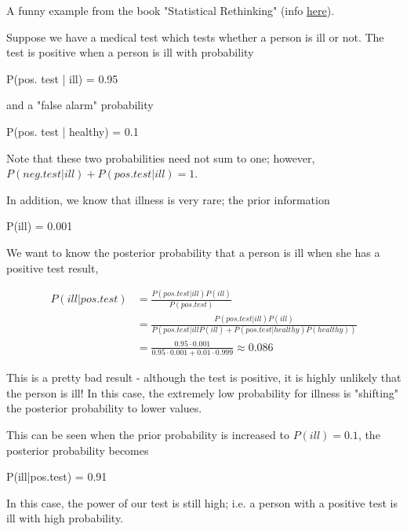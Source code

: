 
A funny example from the book "Statistical Rethinking" (info \href{https://xcelab.net/rm/statistical-rethinking/}{here}).

Suppose we have a medical test which tests whether a person is ill or not. The test is positive when a person is ill with probability

\bee
P(pos. test | ill) = 0.95
\eee

and a "false alarm" probability

\bee
P(pos. test | healthy) = 0.1
\eee

Note that these two probabilities need not sum to one; however, $P(neg. test | ill) + P(pos. test | ill) = 1$.

In addition, we know that illness is very rare; the prior information

\bee
P(ill) = 0.001
\eee

We want to know the posterior probability that a person is ill when she has a positive test result,

\begin{align*}
P(ill|pos. test) &= \frac{P(pos. test | ill)P(ill)}{P(pos. test)} \\ &= \frac{P(pos. test | ill)P(ill)}{P(pos. test|illP(ill) + P(pos. test | healthy)P(healthy))} \\ &= \frac{0.95 \cdot 0.001}{0.95 \cdot 0.001 + 0.01 \cdot 0.999} \approx 0.086
\end{align*}

This is a pretty bad result - although the test is positive, it is highly unlikely that the person is ill! In this case, the extremely low probability for illness is "shifting" the posterior probability to lower values.

This can be seen when the prior probability is increased to $P(ill) = 0.1$, the posterior probability becomes

\bee
P(ill|pos.test) = 0.91
\eee

In this case, the power of our test is still high; i.e. a person with a positive test is ill with high probability.




